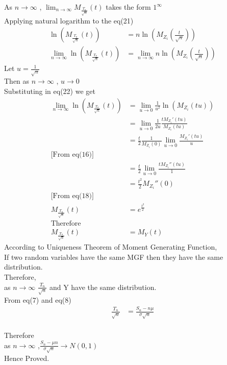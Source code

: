 \documentclass[journal,12pt,twocolumn]{IEEEtran}
\begin{document}
As $n \to \infty $ , $\lim_{n \to \infty} M_{\frac{T_n}{\sqrt{n}}}(t)$ takes the form $1^\infty$
\\Applying natural logarithm to the eq(21)
 \begin{align}
    \ln(M_{\frac{T_n}{\sqrt{n}}}(t))&=n\ln(M_{Z_i}(\frac{t}{\sqrt{n}}))\nonumber\\
    \lim_{n \to \infty}\ln(M_{\frac{T_n}{\sqrt{n}}}(t))&=\lim_{n \to \infty}n\ln(M_{Z_i}(\frac{t}{\sqrt{n}}))
    \end{align}
Let $u=\frac{1}{\sqrt{n}}$
\\Then as $n \to \infty $ , $u \to 0 $ 
\\Substituting in eq(22) we get
\begin{align}
    \lim_{n \to \infty}\ln(M_{\frac{T_n}{\sqrt{n}}}(t))&=\lim_{u \to 0}\frac{1}{u^2}\ln(M_{Z_i}(tu))\nonumber\\
    &=\lim_{u \to 0}\frac{1}{2u}\frac{tM_{Z_i}'(tu)}{M_{Z_i}(tu)}\nonumber\\
    &=\frac{t}{2}\frac{1}{M_{Z_i}(0)}\lim_{u \to 0}\frac{M_{Z_i}'(tu)}{u}\nonumber\\
    \text{[From eq(16)]}\nonumber\\
    &=\frac{t}{2}\lim_{u \to 0}\frac{tM_{Z_i}''(tu)}{1} \nonumber\\
    &=\frac{t^2}{2}M_{Z_i}''(0)\nonumber\\
    \text{[From eq(18)]}\nonumber\\
    M_{\frac{T_n}{\sqrt{n}}}(t)&=e^{\frac{t^2}{2}} \\
    \text{Therefore}\nonumber\\
    M_{\frac{T_n}{\sqrt{n}}}(t)&=M_Y(t)
    \end{align}
According to Uniqueness Theorem of Moment Generating Function,
\\If two random variables have the same MGF then they have the same distribution.
\\Therefore,
\\as $n \to \infty$ $\frac{T_n}{\sqrt{n}}$ and Y have the same distribution.
\\From eq(7) and eq(8)
 \begin{align}
    \frac{T_n}{\sqrt{n}}&= \frac{S_n-n\mu}{\sigma{\sqrt{n}}}
    \end{align}
\\Therefore
\\ as $n \to \infty$ ,$\frac{S_n -\mu{n}}{\sigma{\sqrt{n}}} \to N(0,1)$
\\Hence Proved.
\\
\end{document}
